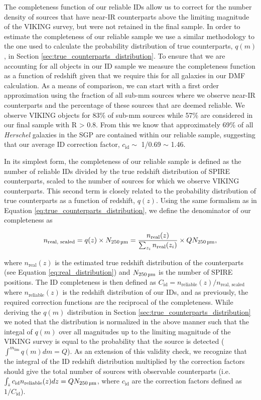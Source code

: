 The completeness function of our reliable IDs allow us to correct for the number density of sources that have near-IR counterparts above the limiting magnitude of the VIKING survey, but were not retained in the final sample. In order to estimate the completeness of our reliable sample we use a similar methodology to the one used to calculate the probability distribution of true counterparts, $q(m)$, in Section \ref{sec:true_counterparts_distribution}. To ensure that we are accounting for all objects in our ID sample we measure the completeness function as a function of redshift given that we require this for all galaxies in our DMF calculation. As a means of comparison, we can start with a first order approximation using the fraction of all sub-mm sources where we observe near-IR counterparts and the percentage of these sources that are deemed reliable. We observe VIKING objects for 83\% of sub-mm sources while 57\% are considered in our final sample with R > 0.8. From this we know that approximately 69\% of all \textit{Herschel} galaxies in the SGP are contained within our reliable sample, suggesting that our average ID correction factor, $c_{\textrm{id}} \sim$ 1/0.69 $\sim$ 1.46.

In its simplest form, the completeness of our reliable sample is defined as the number of reliable IDs divided by the true redshift distribution of SPIRE counterparts, scaled to the number of sources for which we observe VIKING counterparts. This second term is closely related to the probability distribution of true counterparts as a function of redshift, $q(z)$. Using the same formalism as in Equation \ref{eq:true_counterparts_distribution}, we define the denominator of our completeness as

\begin{equation}
    n_{\textrm{real, scaled}} = q(z)\times N_{\textrm{250\,\micron}} = \frac{n_{\textrm{real}}(z)}{\sum_{z_i}n_{\textrm{real}}(z_i)}\times QN_{\textrm{250\,\micron}},
    \label{eq:n_real_scaled}
\end{equation}

\noindent where $n_{\textrm{real}}(z)$ is the estimated true redshift distribution of the counterparts (see Equation \ref{eq:real_distribution}) and $N_{\textrm{250\,\micron}}$ is the number of SPIRE positions. The ID completeness is then defined as $C_{\textrm{id}} = n_{\textrm{reliable}}(z)/n_{\textrm{real, scaled}}$ where $n_{\textrm{reliable}}(z)$ is the redshift distribution of our IDs, and as previously, the required correction functions are the reciprocal of the completeness. While deriving the $q(m)$ distribution in Section \ref{sec:true_counterparts_distribution} we noted that the distribution is normalized in the above manner such that the integal of $q(m)$ over all magnitudes up to the limiting magnitude of the VIKING survey is equal to the probability that the source is detected ($\int^{m_\textrm{lim}} q(m) dm = Q$). As an extension of this validity check, we recognize that the integral of the ID redshift distribution multiplied by the correction factors should give the total number of sources with observable counterparts (i.e. $\int_z c_{\textrm{id}} n_{\textrm{reliable}}(z) dz = QN_{\textrm{250\,\micron}}$, where $c_{\textrm{id}}$ are the correction factors defined as $1/C_{\textrm{id}}$).

